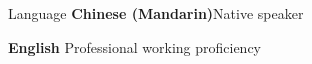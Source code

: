 \begin{rSection}{Language}
\textbf{Chinese (Mandarin)}\hfill{Native speaker}

\textbf{English} \hfill{Professional working proficiency}
\end{rSection}
